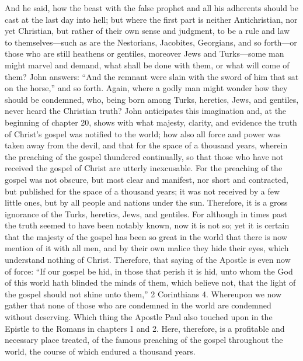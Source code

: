 And he said, how the beast with the false prophet and all his adherents should be cast at the last day into hell; but where the first part is neither Antichristian, nor yet Christian, but rather of their own sense and judgment, to be a rule and law to themselves—such as are the Nestorians, Jacobites, Georgians, and so forth—or those who are still heathens or gentiles, moreover Jews and Turks—some man might marvel and demand, what shall be done with them, or what will come of them? John answers: “And the remnant were slain with the sword of him that sat on the horse,” and so forth. Again, where a godly man might wonder how they should be condemned, who, being born among Turks, heretics, Jews, and gentiles, never heard the Christian truth? John anticipates this imagination and, at the beginning of chapter 20, shows with what majesty, clarity, and evidence the truth of Christ’s gospel was notified to the world; how also all force and power was taken away from the devil, and that for the space of a thousand years, wherein the preaching of the gospel thundered continually, so that those who have not received the gospel of Christ are utterly inexcusable. For the preaching of the gospel was not obscure, but most clear and manifest, nor short and contracted, but published for the space of a thousand years; it was not received by a few little ones, but by all people and nations under the sun. Therefore, it is a gross ignorance of the Turks, heretics, Jews, and gentiles. For although in times past the truth seemed to have been notably known, now it is not so; yet it is certain that the majesty of the gospel has been so great in the world that there is now mention of it with all men, and by their own malice they hide their eyes, which understand nothing of Christ. Therefore, that saying of the Apostle is even now of force: “If our gospel be hid, in those that perish it is hid, unto whom the God of this world hath blinded the minds of them, which believe not, that the light of the gospel should not shine unto them,” 2 Corinthians 4. Whereupon we now gather that none of those who are condemned in the world are condemned without deserving. Which thing the Apostle Paul also touched upon in the Epistle to the Romans in chapters 1 and 2. Here, therefore, is a profitable and necessary place treated, of the famous preaching of the gospel throughout the world, the course of which endured a thousand years.

